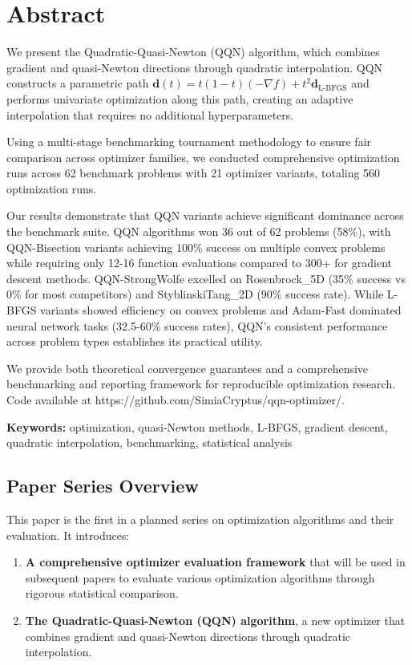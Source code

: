 \hypertarget{abstract}{%
\section{Abstract}\label{abstract}}

We present the Quadratic-Quasi-Newton (QQN) algorithm, which combines gradient and quasi-Newton directions through quadratic interpolation.
QQN constructs a parametric path \(\mathbf{d}(t) = t(1-t)(-\nabla f) + t^2 \mathbf{d}_{\text{L-BFGS}}\) and performs univariate optimization along this path, creating an adaptive interpolation that requires no additional hyperparameters.

Using a multi-stage benchmarking tournament methodology to ensure fair comparison across optimizer families, we conducted comprehensive optimization runs across 62 benchmark problems with 21 optimizer variants, totaling 560 optimization runs.

Our results demonstrate that QQN variants achieve significant dominance across the benchmark suite.
QQN algorithms won 36 out of 62 problems (58\%), with QQN-Bisection variants achieving 100\% success on multiple convex problems while requiring only 12-16 function evaluations compared to 300+ for gradient descent methods.
QQN-StrongWolfe excelled on Rosenbrock\_5D (35\% success vs 0\% for most competitors) and StyblinskiTang\_2D (90\% success rate).
While L-BFGS variants showed efficiency on convex problems and Adam-Fast dominated neural network tasks (32.5-60\% success rates), QQN's consistent performance across problem types establishes its practical utility.

We provide both theoretical convergence guarantees and a comprehensive benchmarking and reporting framework for reproducible optimization research.
Code available at https://github.com/SimiaCryptus/qqn-optimizer/.

\textbf{Keywords:} optimization, quasi-Newton methods, L-BFGS, gradient descent, quadratic interpolation, benchmarking, statistical analysis

\hypertarget{paper-series-overview}{%
\subsection{Paper Series Overview}\label{paper-series-overview}}

This paper is the first in a planned series on optimization algorithms and their evaluation. It introduces:

\begin{enumerate}
\def\labelenumi{\arabic{enumi}.}
\tightlist
\item
  \textbf{A comprehensive optimizer evaluation framework} that will be used in subsequent papers to evaluate various optimization algorithms through rigorous statistical comparison.
\item
  \textbf{The Quadratic-Quasi-Newton (QQN) algorithm}, a new optimizer that combines gradient and quasi-Newton directions through quadratic interpolation.
\end{enumerate}

